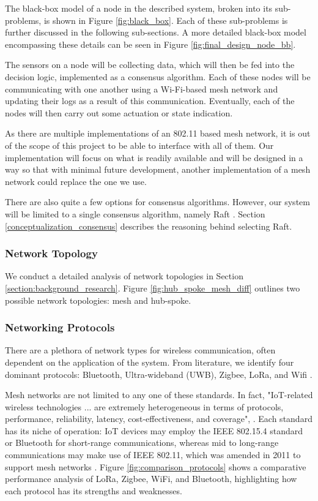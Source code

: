 The black-box model of a node in the described system, broken into its sub-problems, is shown in Figure \ref{fig:black_box}. Each of these sub-problems is further discussed in the following sub-sections. A more detailed black-box model encompassing these details can be seen in Figure \ref{fig:final_design_node_bb}. 

The sensors on a node will be collecting data, which will then be fed into the decision logic, implemented as a consensus algorithm. Each of these nodes will be communicating with one another using a Wi-Fi-based mesh network and updating their logs as a result of this communication. Eventually, each of the nodes will then carry out some actuation or state indication.

As there are multiple implementations of an 802.11 based mesh network, it is out of the scope of this project to be able to interface with all of them. Our implementation will focus on what is readily available and will be designed in a way so that with minimal future development, another implementation of a mesh network could replace the one we use.

There are also quite a few options for consensus algorithms. However, our system will be limited to a single consensus algorithm, namely Raft \cite{raft_paper}. Section \ref{conceptualization_consensus} describes the reasoning behind selecting Raft.


\subsubsection{Network Topology}
\label{section:network_topology}
We conduct a detailed analysis of network topologies in Section \ref{section:background_research}. Figure \ref{fig:hub_spoke_mesh_diff} outlines two possible network topologies: mesh and hub-spoke.

\subsubsection{Networking Protocols}
\label{section:networking_protocols}
There are a plethora of network types for wireless communication, often dependent on the application of the system. From literature, we identify four dominant protocols: Bluetooth, Ultra-wideband (UWB), Zigbee, LoRa, and Wifi \cite{lee2007comparative, ti_lethaby2017wireless}.

Mesh networks are not limited to any one of these standards. In fact, "IoT-related wireless technologies ... are extremely heterogeneous in terms of protocols, performance, reliability, latency, cost-effectiveness, and coverage",  \cite{iot_survey_cilfone2019wireless}. Each standard has its niche of operation: IoT devices may employ the IEEE 802.15.4 standard or Bluetooth for short-range communications, whereas mid to long-range communications may make use of IEEE 802.11, which was amended in 2011 to support mesh networks \cite{ti_lethaby2017wireless, iot_survey_cilfone2019wireless}. Figure \ref{fig:comparison_protocols} shows a comparative performance analysis of LoRa, Zigbee, WiFi, and Bluetooth, highlighting how each protocol has its strengths and weaknesses.


